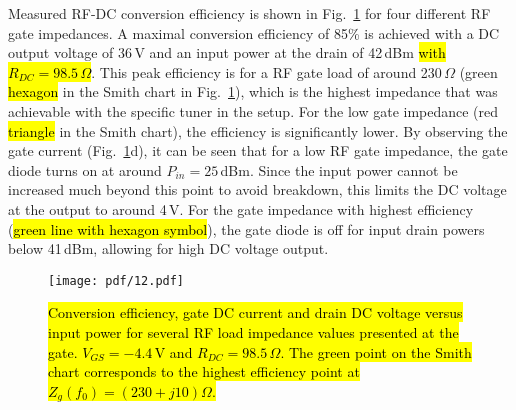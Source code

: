 Measured RF-DC conversion efficiency is shown in Fig.~\ref{MEAS_LP_sweep} for four different RF gate impedances. A maximal conversion efficiency of 85\% is achieved with a DC output voltage of 36\,V and an input power at the drain of 42\,dBm \hl{with $R_{DC}=98.5\,\Omega$}. This peak efficiency is for a RF gate load of around 230\,$\Omega$ (green \hl{hexagon} in the Smith chart in Fig.~\ref{MEAS_LP_sweep}), which is the highest impedance that was achievable with the specific tuner in the setup. For the low gate impedance (red \hl{triangle} in the Smith chart), the efficiency is significantly lower. By observing the gate current (Fig.~\ref{MEAS_LP_sweep}d), it can be seen that for a low RF gate impedance, the gate diode turns on at around $P_{in}=25$\,dBm. Since the input power cannot be increased much beyond this point to avoid breakdown, this limits the DC voltage at the output to around 4\,V. For the gate impedance with highest efficiency (\hl{green line with hexagon symbol}), the gate diode is off for input drain powers below 41\,dBm, allowing for high DC voltage output.






\begin{figure}[ht!]
\centering
\texttt{[image: pdf/12.pdf]}
\caption{\hl{Conversion efficiency, gate DC current and drain DC voltage versus input power for several RF load impedance values presented at the gate. $V_{GS}=-4.4$\,V and $R_{DC}=98.5$\,$\Omega$. The green point on the Smith chart corresponds to the highest efficiency point at $Z_g(f_0)=\left(230+j10\right)\Omega$. }}
\label{MEAS_LP_sweep}
\end{figure}







